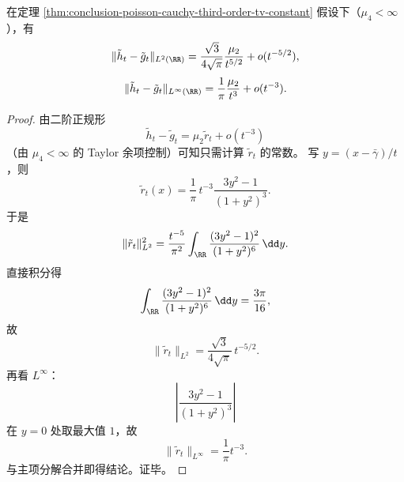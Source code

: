 \begin{theorem}\label{thm:conclusion-poisson-cauchy-l2-linf-sharp}
在定理 \ref{thm:conclusion-poisson-cauchy-third-order-tv-constant} 假设下（\(\mu_4<\infty\)），有
\[
\|\tilde h_t-\tilde g_t\|_{L^2(\RR)}
=
\frac{\sqrt3}{4\sqrt\pi}\frac{\mu_2}{t^{5/2}}+o(t^{-5/2}),
\]
\[
\|\tilde h_t-\tilde g_t\|_{L^\infty(\RR)}
=
\frac{1}{\pi}\frac{\mu_2}{t^{3}}+o(t^{-3}).
\]
\end{theorem}
\begin{proof}
由二阶正规形
\[
\tilde h_t-\tilde g_t=\mu_2\tilde r_t+o(t^{-3})
\]
（由 \(\mu_4<\infty\) 的 Taylor 余项控制）可知只需计算 \(\tilde r_t\) 的常数。
写 \(y=(x-\bar\gamma)/t\)，则
\[
\tilde r_t(x)=\frac1\pi\,t^{-3}\frac{3y^2-1}{(1+y^2)^3}.
\]
于是
\[
\|\tilde r_t\|_{L^2}^2
=
\frac{t^{-5}}{\pi^2}\int_{\RR}\frac{(3y^2-1)^2}{(1+y^2)^6}\,\dd y.
\]
直接积分得
\[
\int_{\RR}\frac{(3y^2-1)^2}{(1+y^2)^6}\,\dd y=\frac{3\pi}{16},
\]
故
\[
\|\tilde r_t\|_{L^2}
=
\frac{\sqrt3}{4\sqrt\pi}\,t^{-5/2}.
\]
再看 \(L^\infty\)：
\[
\left|\frac{3y^2-1}{(1+y^2)^3}\right|
\]
在 \(y=0\) 处取最大值 \(1\)，故
\[
\|\tilde r_t\|_{L^\infty}=\frac1\pi t^{-3}.
\]
与主项分解合并即得结论。证毕。
\end{proof}
